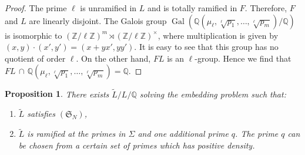 \documentclass[11pt,reqno]{amsart}
\newtheorem{proposition}[theorem]{Proposition}
\newcommand{\Z}{\mathbb{Z}}
\newcommand{\Q}{\mathbb{Q}}
\newcommand{\op}[1]{\operatorname{#1}}
\numberwithin{equation}{section}
\begin{document}
\begin{proof}
    The prime $\ell$ is unramified in $L$ and is totally ramified in $F$. Therefore, $F$ and $L$ are linearly disjoint. The Galois group $\op{Gal}(\Q(\mu_\ell, \sqrt[\ell]{p_1}, \dots, \sqrt[\ell]{p_m})/\Q)$ is isomorphic to $(\Z/\ell \Z)^m\rtimes (\Z/\ell\Z)^\times$, where multiplication is given by $(x,y)\cdot(x',y')=(x+yx', yy')$. It is easy to see that this group has no quotient of order $\ell$. On the other hand, $FL$ is an $\ell$-group. Hence we find that $FL \, \cap \,  \Q(\mu_\ell, \sqrt[\ell]{p_1}, \dots, \sqrt[\ell]{p_m})=\Q$.
\end{proof}

\begin{proposition}\label{constructing tilde L satisfying SN}
    There exists $\widetilde{L}/L/\Q$ solving the embedding problem such that:
    \begin{enumerate}
        \item $\widetilde{L}$ satisfies $(\mathfrak{S}_N)$,
        \item $\widetilde{L}$ is ramified at the primes in $\Sigma$ and one additional prime $q$. The prime $q$ can be chosen from a certain set of primes which has positive density.
    \end{enumerate}
     
\end{proposition}
\end{document}
